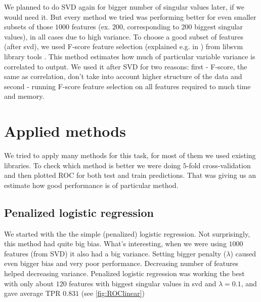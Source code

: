\documentclass[]{report}
\begin{document}
 We planned to do SVD again for bigger number of singular values later, if we would need it. But every method we tried was performing better for even smaller subsets of those $1000$ features (ex. $200$, corresponding to $200$ biggest singular values), in all cases due to high variance. To choose a good subset of features (after svd), we used F-score feature selection (explained e.g. in \cite{fscore}) from libsvm library tools \cite{fselection}.
  This method estimates how much of particular variable variance  is correlated to output. We used it after SVD for two reasons: first - F-score, the same as correlation, don't take into account higher structure of the data and second - running F-score feature selection on all features required to much time and memory.


\section{Applied methods}
We tried to apply many methods for this task, for most of them we used existing libraries. To check which method is better we were doing $5$-fold cross-validation and then plotted ROC for both test and train predictions. That was giving us an estimate how good performance is of particular method.

\subsection{Penalized logistic regression}
We started with the the simple (penalized) logistic regression. Not surprisingly, this method had quite big bias. What's interesting, when we were using $1000$ features (from SVD) it also had a big variance. Setting bigger penalty ($\lambda$) caused even bigger bias and very poor performance. Decreasing number of features helped decreasing variance. Penalized logistic regression was working the best with only about $120$ features with biggest singular values in svd and $\lambda = 0.1$, and gave average TPR $0.831$ (see \ref{fig:ROClinear})

\end{document}

